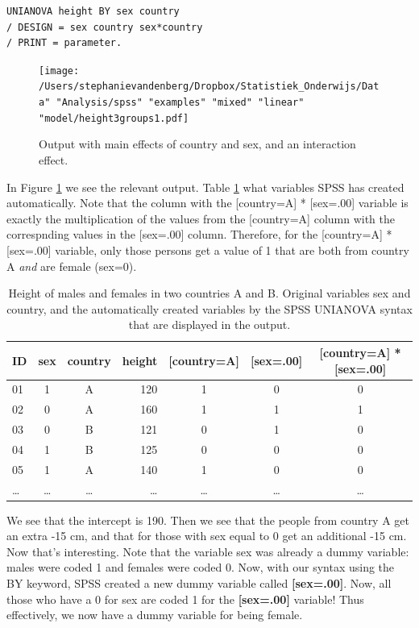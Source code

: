 \documentclass[]{book}\usepackage[]{graphicx}\usepackage[]{color}
\begin{document}
\begin{verbatim}
UNIANOVA height BY sex country 
/ DESIGN = sex country sex*country
/ PRINT = parameter.
\end{verbatim}


\begin{figure}[h]
    \begin{center}
       \texttt{[image: /Users/stephanievandenberg/Dropbox/Statistiek\_Onderwijs/Data" "Analysis/spss" "examples" "mixed" "linear" "model/height3groups1.pdf]}
    \end{center}
    \caption{Output with main effects of country and sex, and an interaction effect.}
     \label{fig:interactionheightcountrysex}
\end{figure}

In Figure \ref{fig:interactionheightcountrysex} we see the relevant output. Table \ref{tab:2countries} what variables SPSS has created automatically. Note that the column with the [country=A] * [sex=.00] variable is exactly the multiplication of the values from the [country=A] column with the correspnding values in the [sex=.00] column. Therefore, for the [country=A] * [sex=.00] variable, only those persons get a value of 1 that are both from country A \textit{and} are female (sex=0). 


\begin{table}
 \caption{Height of males and females in two countries A and B. Original variables sex and country, and the automatically created variables by the SPSS UNIANOVA syntax that are displayed in the output.}
 \begin{tabular}{lccrccc}
 ID & sex & country & height &  [country=A] & [sex=.00] &[country=A] * [sex=.00]      \\ \hline
 01 & 1 & A & 120 &  1 &0 & 0         \\
 02 & 0 & A & 160 &   1&1 & 1        \\
 03 & 0 & B & 121 &  0 &1& 0       \\
 04 & 1 & B & 125 &  0 &0 &0          \\
 05 & 1 & A & 140 &  1 &0 & 0       \\
 \dots & \dots & \dots & \dots &\dots   & \dots&  \dots       \\
 \end{tabular}
 \label{tab:2countries}
 \end{table}



We see that the intercept is 190. Then we see that the people from country A get an extra -15 cm, and that for those with sex equal to 0 get an additional -15 cm. Now that's interesting. Note that the variable sex was already a dummy variable: males were coded 1 and females were coded 0. Now, with our syntax using the BY keyword, SPSS created a new dummy variable called \textbf{[sex=.00]}. Now, all those who have a 0 for sex are coded 1 for the \textbf{[sex=.00]} variable! Thus effectively, we now have a dummy variable for being female. 
\end{document}
